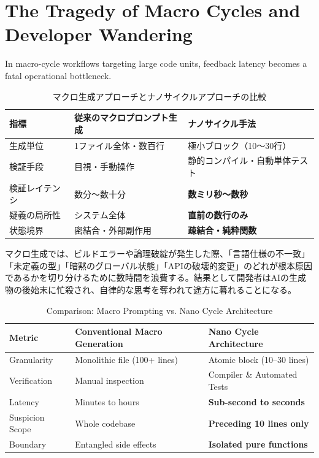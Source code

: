 \documentclass[11pt,a4paper,openany]{book}
\newif\ifja
\begin{document}
  \section{The Tragedy of Macro Cycles and Developer Wandering}
  In macro-cycle workflows targeting large code units, feedback latency becomes a fatal operational bottleneck.
\fi

\ifja
  \begin{table}[htbp]
    \centering
    \begin{tabular}{lll}
      \toprule
      \textbf{指標} & \textbf{従来のマクロプロンプト生成} & \textbf{ナノサイクル手法} \\
      \midrule
      生成単位 & 1ファイル全体・数百行 & 極小ブロック（10〜30行） \\
      検証手段 & 目視・手動操作 & 静的コンパイル・自動単体テスト \\
      検証レイテンシ & 数分〜数十分 & \textbf{数ミリ秒〜数秒} \\
      疑義の局所性 & システム全体 & \textbf{直前の数行のみ} \\
      状態境界 & 密結合・外部副作用 & \textbf{疎結合・純粋関数} \\
      \bottomrule
    \end{tabular}
    \caption{マクロ生成アプローチとナノサイクルアプローチの比較}
  \end{table}

  マクロ生成では、ビルドエラーや論理破綻が発生した際、「言語仕様の不一致」「未定義の型」「暗黙のグローバル状態」「APIの破壊的変更」のどれが根本原因であるかを切り分けるために数時間を浪費する。結果として開発者はAIの生成物の後始末に忙殺され、自律的な思考を奪われて途方に暮れることになる。
\else
  \begin{table}[htbp]
    \centering
    \begin{tabular}{lll}
      \toprule
      \textbf{Metric} & \textbf{Conventional Macro Generation} & \textbf{Nano Cycle Architecture} \\
      \midrule
      Granularity & Monolithic file (100+ lines) & Atomic block (10--30 lines) \\
      Verification & Manual inspection & Compiler \& Automated Tests \\
      Latency & Minutes to hours & \textbf{Sub-second to seconds} \\
      Suspicion Scope & Whole codebase & \textbf{Preceding 10 lines only} \\
      Boundary & Entangled side effects & \textbf{Isolated pure functions} \\
      \bottomrule
    \end{tabular}
    \caption{Comparison: Macro Prompting vs. Nano Cycle Architecture}
  \end{table}
\end{document}
